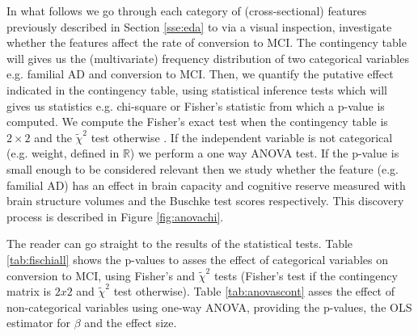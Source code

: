 \documentclass[11pt]{article}
\theoremstyle{definition}
\theoremstyle{remark}
\begin{document}
In what follows we go through each category of (cross-sectional) features previously described in Section \ref{sse:eda} to via a visual inspection, investigate whether the features affect the rate of conversion to MCI. The contingency table \cite{everitt1992analysis} will gives us the (multivariate) frequency distribution of two categorical variables e.g. familial AD and conversion to MCI. Then, we quantify the putative effect indicated in the contingency table, using statistical inference tests which will gives us statistics e.g. chi-square or Fisher's statistic from which a p-value is computed. 
We compute the Fisher's exact test when the contingency table is $2 \times 2$ and the $\tilde{\chi}^2$ test otherwise \cite{scipy2010}. If the independent variable is not categorical (e.g. weight, defined in $\mathbb{R}$) we perform a one way ANOVA test.
If the p-value is small enough to be considered relevant then we study whether the feature (e.g. familial AD) has an effect in brain capacity and cognitive reserve measured with brain structure volumes and the Buschke test scores respectively.
This discovery process is described in Figure \ref{fig:anovachi}. 

The reader can go straight to the results of the statistical tests. Table \ref{tab:fischiall} shows the p-values to asses the effect of categorical variables on conversion to MCI, using Fisher's and $\tilde{\chi}^2$ tests (Fisher's test if the contingency matrix is $2x2$  and $\tilde{\chi}^2$ test otherwise). Table \ref{tab:anovascont} asses the effect of non-categorical variables using one-way ANOVA, providing the p-values, the OLS estimator for $\beta$ and the effect size.


\end{document}
